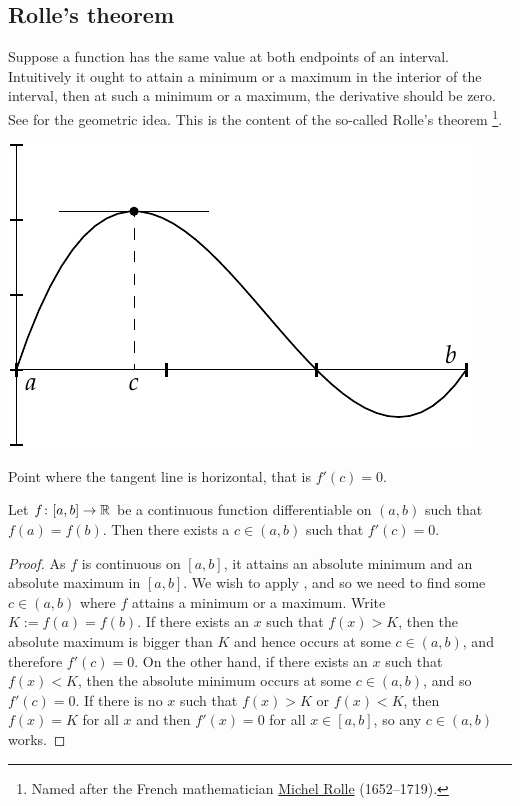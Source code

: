 \subsection{Rolle's theorem}

Suppose a function has the same value at both endpoints of an interval.
Intuitively it ought to attain a minimum or a maximum in the interior of the
interval,
then at such a minimum or a maximum, the derivative should be zero.
See  for the geometric idea.  This is the content of the
so-called Rolle's theorem%
\footnote{Named after the French mathematician
\href{https://en.wikipedia.org/wiki/Michel_Rolle}{Michel Rolle}
(1652--1719).}.

\begin{myfigureht}
\includegraphics{figures/rollefig}
\caption{Point where the tangent line is horizontal, that is $f'(c) =
0$.\label{rollefig}}
\end{myfigureht}

\begin{thm}[Rolle] \label{thm:rolle}
Let $f \colon [a,b] \to {\mathbb{R}}$ be a continuous function
differentiable on $(a,b)$ such that $f(a) = f(b)$.
Then there exists a $c \in (a,b)$ such that $f'(c) = 0$.
\end{thm}

\begin{proof}
As $f$ is continuous on $[a,b]$, it attains an absolute minimum and an
absolute 
maximum in $[a,b]$.  We wish to apply , and
so we need to find some $c \in (a,b)$ where $f$ attains a minimum or a
maximum.
Write $K := f(a) = f(b)$.
If there exists an $x$ such that $f(x) > K$, then the absolute
maximum is bigger than $K$ and hence occurs at some $c \in (a,b)$, and
therefore $f'(c) = 0$.  On the other hand, if there exists an $x$
such that $f(x) < K$, then the absolute minimum occurs at some
$c \in (a,b)$, and so $f'(c) = 0$.  If there is no $x$ such that
$f(x) > K$ or
$f(x) < K$, then $f(x) = K$ for all $x$ and then
$f'(x) = 0$ for all $x \in [a,b]$, so any $c \in (a,b)$ works.
\end{proof}

